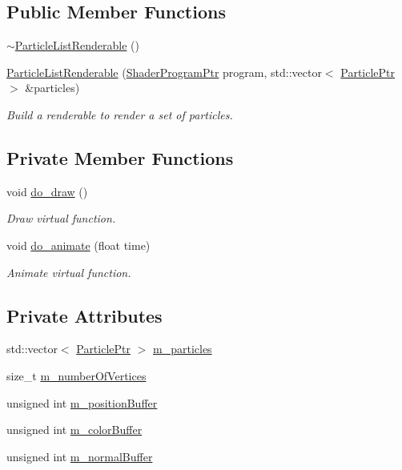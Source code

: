 \subsection*{Public Member Functions}
\begin{DoxyCompactItemize}
\item 
\hyperlink{classParticleListRenderable_a24b513eaf7e3c847270d7da34cb1208d}{$\sim$\+Particle\+List\+Renderable} ()
\item 
\hyperlink{classParticleListRenderable_a847158b58dccb013af2902b40361363e}{Particle\+List\+Renderable} (\hyperlink{ShaderProgram_8hpp_af8e4af1ad4c53875ee5d32ab7e1f4966}{Shader\+Program\+Ptr} program, std\+::vector$<$ \hyperlink{Particle_8hpp_a9a7abc8635002993537b61ef2c857fdd}{Particle\+Ptr} $>$ \&particles)
\begin{DoxyCompactList}\small\item\em Build a renderable to render a set of particles. \end{DoxyCompactList}\end{DoxyCompactItemize}
\subsection*{Private Member Functions}
\begin{DoxyCompactItemize}
\item 
void \hyperlink{classParticleListRenderable_af34f9d0c377aa749e52d226d9cf49d89}{do\+\_\+draw} ()
\begin{DoxyCompactList}\small\item\em Draw virtual function. \end{DoxyCompactList}\item 
void \hyperlink{classParticleListRenderable_a25adb6020cb86abb50d33d76a5cde1f1}{do\+\_\+animate} (float time)
\begin{DoxyCompactList}\small\item\em Animate virtual function. \end{DoxyCompactList}\end{DoxyCompactItemize}
\subsection*{Private Attributes}
\begin{DoxyCompactItemize}
\item 
std\+::vector$<$ \hyperlink{Particle_8hpp_a9a7abc8635002993537b61ef2c857fdd}{Particle\+Ptr} $>$ \hyperlink{classParticleListRenderable_a2debf6d432dfd9854718e0c16c4f6f51}{m\+\_\+particles}
\item 
size\+\_\+t \hyperlink{classParticleListRenderable_a0971e99dfa53c5729d040b6a96d47a4f}{m\+\_\+number\+Of\+Vertices}
\item 
unsigned int \hyperlink{classParticleListRenderable_a87f491d5861bb1b9f98541e5926c4c5e}{m\+\_\+position\+Buffer}
\item 
unsigned int \hyperlink{classParticleListRenderable_a7e967af4fe279662d35d1cf08e4e2e86}{m\+\_\+color\+Buffer}
\item 
unsigned int \hyperlink{classParticleListRenderable_ae6b22324c801f946afe8a9eee5ff7be5}{m\+\_\+normal\+Buffer}
\end{DoxyCompactItemize}
